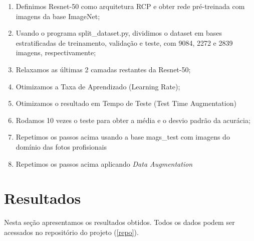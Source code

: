 \documentclass[conference]{IEEEtran}
\begin{document}
 \begin{enumerate}
  \item Definimos Resnet-50 como arquitetura RCP e obter rede pré-treinada com imagens da base ImageNet;
  \item Usando o programa split\_dataset.py, dividimos o dataset em bases estratificadas de treinamento, validação e teste, com 9084, 2272 e 2839 imagens, respectivamente;
  \item Relaxamos as últimas 2 camadas restantes da Resnet-50;
  \item Otimizamos a Taxa de Aprendizado (Learning Rate);
  \item Otimizamos o resultado em Tempo de Teste (Test Time Augmentation)
  \item Rodamos 10 vezes o teste para obter a média e o desvio padrão da acurácia;
  \item Repetimos os passos acima usando a base mags\_test com imagens do domínio das fotos profisionais
  \item Repetimos os passos acima aplicando \textit{Data Augmentation} 
\end{enumerate}
\section{Resultados}
Nesta seção apresentamos os resultados obtidos. Todos os dados podem ser acessados no repositório do projeto (\ref{repo}).
\end{document}
